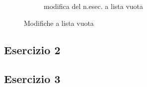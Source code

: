\documentclass[a4paper]{article}
\begin{document}
\begin{figure}
\begin{subfigure}[b]{0.5\textwidth}
\caption{modifica del n.esec. a lista vuota}
\end{subfigure}
\caption{Modifiche a lista vuota}
\end{figure}

\subsection{Esercizio 2}
\subsection{Esercizio 3}
\end{document}
